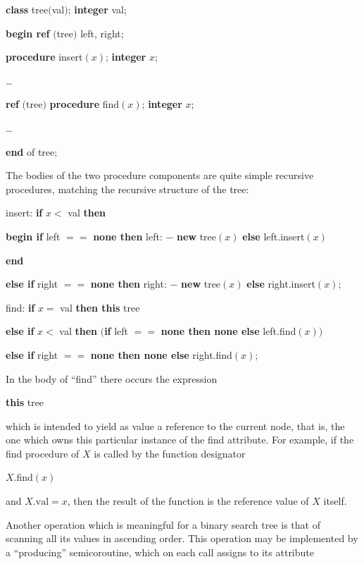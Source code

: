\quad \textbf{class} tree$($val$)$; \textbf{integer} val;

\quad \quad \textbf{begin ref} $($tree$)$ left, right;

\quad \quad \quad \textbf{procedure} insert$(x)$; \textbf{integer} $x$;

\quad \quad \quad \quad \dots

\quad \quad \quad \textbf{ref} $($tree$)$ \textbf{procedure} find$(x)$; \textbf{integer} $x$;

\quad \quad \quad \quad \dots

\quad \quad \textbf{end} of tree;

The bodies of the two procedure components are quite simple recursive procedures, matching the recursive structure of the tree:

\quad insert: \textbf{if} $x <$ val \textbf{then}

\quad \quad \textbf{begin if} left $==$ \textbf{none then} left: $-$ \textbf{new} tree$(x)$ \textbf{else} left.insert$(x)$

\quad \quad \textbf{end}

\quad \textbf{else if} right $==$ \textbf{none then} right: $-$ \textbf{new} tree$(x)$ \textbf{else} right.insert$(x)$;
\smallskip

\quad find: \textbf{if} $x =$ val \textbf{then this} tree

\quad \textbf{else if} $x <$ val \textbf{then} $($\textbf{if} left $==$ \textbf{none then none else} left.find$(x))$

\quad \textbf{else if} right $==$ \textbf{none then none else} right.find$(x);$

\noindent
In the body of ``find'' there occurs the expression

\quad \textbf{this} tree

\noindent
which is intended to yield as value a reference to the current node, that is, the one which owns this particular instance of the find attribute. For example, if the find procedure of $X$ is called by the function designator 

\quad $X.$find$(x)$

\noindent
and $X.\text{val} = x$, then the result of the function is the reference value of $X$ itself.

Another operation which is meaningful for a binary search tree is that of scanning all its values in ascending order. This operation may be implemented by a ``producing'' semicoroutine, which on each call assigns to its attribute

